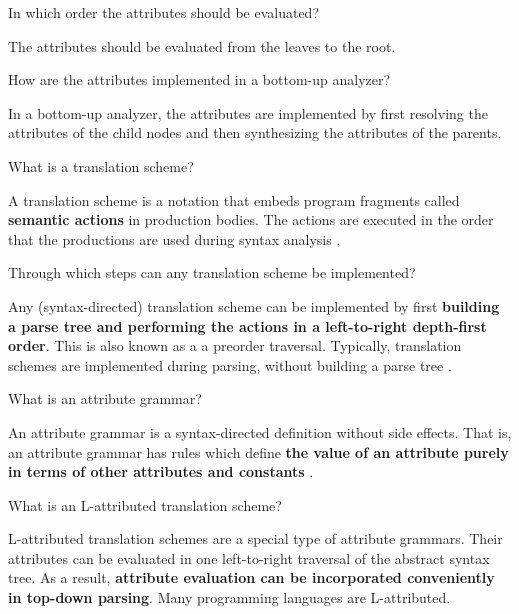 \begin{Exercise}
In which order the attributes should be evaluated?
\end{Exercise}
\begin{Answer}
The attributes should be evaluated from the leaves to the root.
\end{Answer}

\begin{Exercise}
How are the attributes implemented in a bottom-up analyzer?
\end{Exercise}
\begin{Answer}
In a bottom-up analyzer, the attributes are implemented by first resolving the attributes of the child nodes and then synthesizing the attributes of the parents.
\end{Answer}

\begin{Exercise}
What is a translation scheme?
\end{Exercise}
\begin{Answer}
A translation scheme is a notation that embeds program fragments called
\textbf{semantic actions} in production bodies.
The actions are executed in the order that the productions are used during syntax analysis \cite[p.~107]{compilers-aho-2007}.
\end{Answer}

\begin{Exercise}
Through which steps can any translation scheme be implemented?
\end{Exercise}
\begin{Answer}
Any (syntax-directed) translation scheme can be implemented by first \textbf{building a parse tree and performing the actions in a left-to-right depth-first order}. This is also known as a a preorder traversal.
Typically, translation schemes are implemented during parsing, without building a parse tree \cite[p.~324]{compilers-aho-2007}.
\end{Answer}

\begin{Exercise}
What is an attribute grammar?
\end{Exercise}
\begin{Answer}
An attribute grammar is a syntax-directed definition without side effects.
That is, an attribute grammar has rules which define \textbf{the value of an attribute purely in terms of other attributes and constants} \cite[p.~306]{compilers-aho-2007}.
\end{Answer}

\begin{Exercise}
What is an L-attributed translation scheme?
\end{Exercise}
\begin{Answer}
L-attributed translation schemes are a special type of attribute grammars.
Their attributes can be evaluated in one left-to-right traversal of the abstract syntax tree.
As a result, \textbf{attribute evaluation can be incorporated conveniently in top-down parsing}.
Many programming languages are L-attributed.
\end{Answer}


